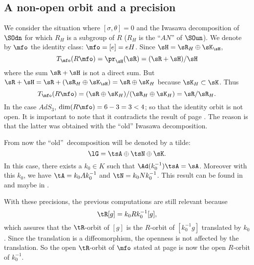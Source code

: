 \subsection{A non-open orbit and a precision}\label{subsec:precision}

We consider the situation where $[\sigma,\theta]=0$ and the Iwasawa decomposition of $\SOdn$ for which $R_H$ is a subgroup of $R$ ($R_H$ is the ``$AN$''{} of $\SOun$). We denote by $\mfo$ the identity class: $\mfo=[e]=eH$. Since $\sH=\sR_H\oplus\sK_{\sH}$,
\[
   T_{\mfo}(R\mfo)=\pr_{\sH}(\sR)=(\sR+\sH)/\sH
\]
where the sum $\sR+\sH$ is not a direct sum. But $\sR+\sH=\sR+(\sR_H\oplus\sK_{\sH})=\sR\oplus\sK_H$ because $\sK_H\subset\sK$. Thus
\[
   T_{\mfo}(R\mfo)=(\sR\oplus\sK_H)/(\sR_H\oplus\sK_H)=\sR/\sR_H.
\]
\label{pg:subt_tilde}In the case $AdS_3$, $\dim(R\mfo)=6-3=3<4$; so that the identity orbit is not open. It is important to note that it contradicts the result of page \pageref{pg:mfo_ouvert}. The reason is that the latter was obtained with the ``old''{} Iwasawa decomposition.

From now the ``old''\ decomposition will be denoted by a tilde: 
\[
\lG=\tsA\oplus\tsN\oplus\sK.
\]
In this case, there exists a $k_0\in K$ such that $\Ad(k_0^{-1})\tsA=\sA$.  Moreover with this $k_0$, we have $\tA=k_0Ak_0^{-1}$ and $\tN=k_0Nk_0^{-1}$. This result can be found in \cite{Helgason} and maybe in \cite{Wisser}.

With these precisions, the previous computations are still relevant because  
\begin{equation}
   \tR[g]=k_0Rk_0^{-1}[g],
\end{equation}
which assures that the $\tR$-orbit of $[g]$ is the $R$-orbit of $[k_0^{-1} g]$ translated by
$k_0$. Since the translation is a diffeomorphism, the openness is not affected by the
translation. So the open $\tR$-orbit of $\mfo$ stated at page
\pageref{pg:mfo_ouvert} is now the open $R$-orbit of $k_0^{-1}$.

